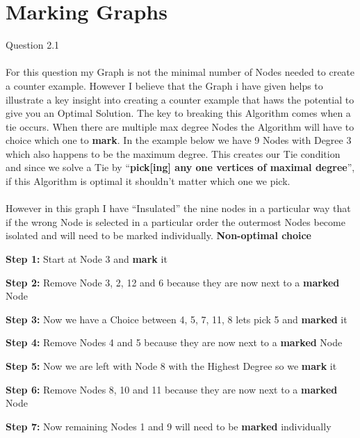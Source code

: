 \documentclass[10pt]{article}
\begin{document}
\part{Marking Graphs}
Question 2.1
\\
\\
For this question my Graph is not the minimal number of Nodes needed to create a counter example. However I believe that the Graph i have given helps to illustrate a key insight into creating a counter example that haws the potential to give you an Optimal Solution. The key to breaking this Algorithm comes when a tie occurs. When there are multiple max degree Nodes the Algorithm will have to choice which one to \textbf{mark}. In the example below we have 9 Nodes with Degree 3 which also happens to be the maximum degree. This creates our Tie condition and since we solve a Tie by \enquote{\textbf{pick[ing] any one vertices of maximal degree}}, if this Algorithm is optimal it shouldn't matter which one we pick.
\\
\\
However in this graph I have \enquote{Insulated} the nine nodes in a particular way that if the wrong Node is selected in a particular order the outermost Nodes become isolated and will need to be marked individually.  
\hfill \break
\break
\textbf{Non-optimal choice}
\begin{steps}
  \item \textbf{Step 1:} Start at Node 3 and \textbf{mark} it
  \item \textbf{Step 2:} Remove Node 3, 2, 12 and 6 because they are now next to a \textbf{marked} Node
  \item \textbf{Step 3:} Now we have a Choice between 4, 5, 7, 11, 8 lets pick 5 and \textbf{marked} it
  \item \textbf{Step 4:} Remove Nodes 4 and 5 because they are now next to a \textbf{marked} Node
  \item \textbf{Step 5:} Now we are left with Node 8 with the Highest Degree so we \textbf{mark} it
  \item \textbf{Step 6:} Remove Nodes 8, 10 and 11 because they are now next to a \textbf{marked} Node
  \item \textbf{Step 7:} Now remaining Nodes 1 and 9 will need to be \textbf{marked} individually 

\end{steps}
\hfill \break
\end{document}
